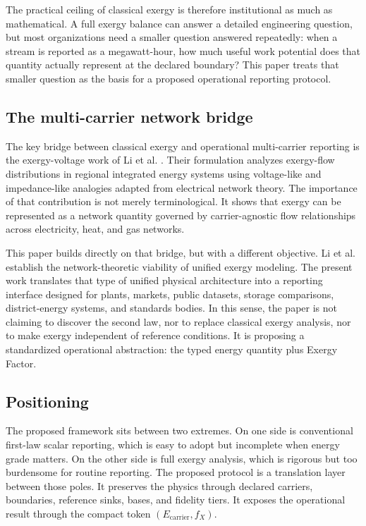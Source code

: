 \documentclass[11pt]{article}
\newcommand{\fx}{f_X}
\begin{document}
The practical ceiling of classical exergy is therefore institutional as much as mathematical. A full exergy balance can answer a detailed engineering question, but most organizations need a smaller question answered repeatedly: when a stream is reported as a megawatt-hour, how much useful work potential does that quantity actually represent at the declared boundary? This paper treats that smaller question as the basis for a proposed operational reporting protocol.

\subsection*{The multi-carrier network bridge}

The key bridge between classical exergy and operational multi-carrier reporting is the exergy-voltage work of Li et al. \cite{li2022}. Their formulation analyzes exergy-flow distributions in regional integrated energy systems using voltage-like and impedance-like analogies adapted from electrical network theory. The importance of that contribution is not merely terminological. It shows that exergy can be represented as a network quantity governed by carrier-agnostic flow relationships across electricity, heat, and gas networks.

This paper builds directly on that bridge, but with a different objective. Li et al. establish the network-theoretic viability of unified exergy modeling. The present work translates that type of unified physical architecture into a reporting interface designed for plants, markets, public datasets, storage comparisons, district-energy systems, and standards bodies. In this sense, the paper is not claiming to discover the second law, nor to replace classical exergy analysis, nor to make exergy independent of reference conditions. It is proposing a standardized operational abstraction: the typed energy quantity plus Exergy Factor.

\subsection*{Positioning}

The proposed framework sits between two extremes. On one side is conventional first-law scalar reporting, which is easy to adopt but incomplete when energy grade matters. On the other side is full exergy analysis, which is rigorous but too burdensome for routine reporting. The proposed protocol is a translation layer between those poles. It preserves the physics through declared carriers, boundaries, reference sinks, bases, and fidelity tiers. It exposes the operational result through the compact token $(E_{\mathrm{carrier}},\fx)$.
\end{document}
